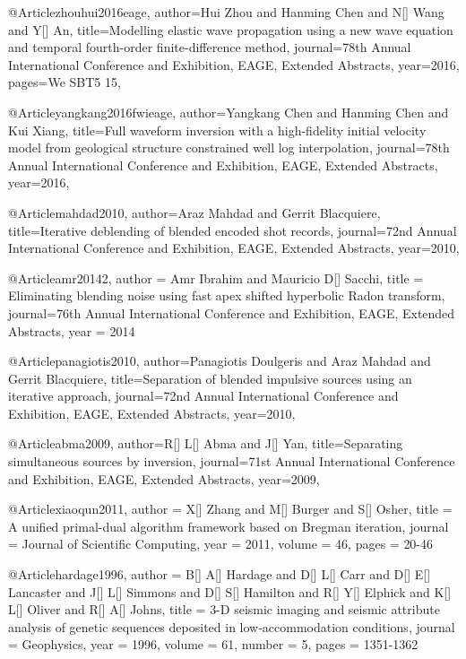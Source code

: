 {@Article{zhouhui2016eage,
  author={Hui Zhou and Hanming Chen and N[] Wang and Y[] An},
  title={Modelling elastic wave propagation using a new wave equation and temporal fourth-order finite-difference  method},
  journal={78th Annual International Conference and Exhibition, EAGE, Extended Abstracts},
  year=2016,
  pages={We SBT5 15},
}

@Article{yangkang2016fwieage,
  author={Yangkang Chen and Hanming Chen and Kui Xiang},
  title={Full waveform inversion with a high-fidelity initial velocity model from geological structure constrained well log interpolation},
  journal={78th Annual International Conference and Exhibition, EAGE, Extended Abstracts},
  year=2016,
}

@Article{mahdad2010,
  author={Araz Mahdad and Gerrit Blacquiere},
  title={Iterative deblending of blended encoded shot records},
  journal={72nd Annual International Conference and Exhibition, EAGE, Extended Abstracts},
  year=2010,
}

@Article{amr20142,
  author = 	 {Amr Ibrahim and Mauricio D[] Sacchi},
  title = 	 {Eliminating blending noise using fast apex shifted hyperbolic Radon transform},
  journal={76th Annual International Conference and Exhibition, EAGE, Extended Abstracts},
  year = 	 2014} 
  
@Article{panagiotis2010,
  author={Panagiotis Doulgeris and Araz Mahdad and Gerrit Blacquiere},
  title={Separation of blended impulsive sources using an iterative approach},
  journal={72nd Annual International Conference and Exhibition, EAGE, Extended Abstracts},
  year=2010,
}

@Article{abma2009,
  author={R[] L[] Abma and J[] Yan},
  title={Separating simultaneous sources by inversion},
  journal={71st Annual International Conference and Exhibition, EAGE, Extended Abstracts},
  year=2009,
}

@Article{xiaoqun2011,
  author = 	 {X[] Zhang and M[] Burger and S[] Osher},
  title = 	 {A unified primal-dual algorithm framework based on Bregman iteration},
  journal = 	 {Journal of Scientific Computing},
  year = 	 2011,
  volume = 	 46,
  pages = 	 {20-46}}
  
  
  
@Article{hardage1996,
  author = 	 {B[] A[] Hardage and D[] L[] Carr and D[] E[] Lancaster and J[] L[] Simmons and D[] S[] Hamilton and R[] Y[] Elphick and K[] L[] Oliver and R[] A[] Johns},
  title = 	 {3-D seismic imaging and seismic attribute analysis of genetic sequences deposited in low‐accommodation conditions},
  journal = 	 {Geophysics},
  year = 	 1996,
  volume = 	 61,
  number = 	 5,
  pages = 	 {1351-1362}}

}
